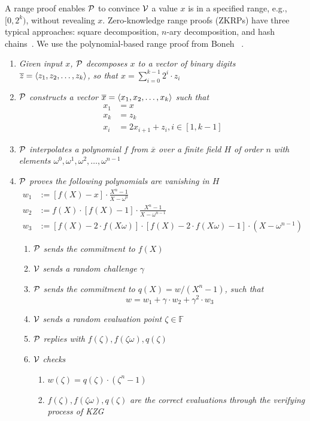 A range proof enables $\mathcal{P}$ to convince $\mathcal{V}$ a value $x$ is in a specified range, e.g., $[0,2^k)$, without revealing $x$. Zero-knowledge range proofs (ZKRPs) have three typical approaches: square decomposition, $n$-ary decomposition, and hash chains~\cite{zkrp}. We use the polynomial-based range proof from Boneh \etal~\cite{rangeproof}.
\begin{enumerate}
    \item \textit{Given input $x$, $\mathcal{P}$ decomposes $x$ to a vector of binary digits $\overline{z}=\left \langle z_1,z_2,\dots,z_k \right \rangle$, so that $x=\sum_{i=0}^{k-1}2^i\cdot{z_i}$} 
    \item \textit{$\mathcal{P}$ constructs a vector $\overline{x}=\left \langle x_1,x_2,\dots,x_k \right \rangle$ such that}
    \begin{align*}
        x_1&=x \\
        x_k&=z_k \\
        x_i&=2x_{i+1}+z_i,i\in[1,k-1]
    \end{align*}
    \item \textit{$\mathcal{P}$ interpolates a polynomial $f$ from $\overline{x}$ over a finite field $H$ of order $n$ with elements $\omega^0,\omega^1,\omega^2,\ldots,\omega^{n-1}$} 
    \item \textit{$\mathcal{P}$ proves the following polynomials are vanishing in $H$}
    \begin{align*}
        w_1&:=[f(X)-x]\cdot\frac{X^n-1}{X-\omega^0} \\
        w_2&:=f(X)\cdot[f(X)-1]\cdot\frac{X^n-1}{X-\omega^{n-1}} \\
        w_3&:=[f(X)-2\cdot{f(X\omega)}]\cdot[f(X)-2\cdot{f(X\omega)}-1]\cdot(X-\omega^{n-1})
    \end{align*}
    \begin{enumerate}
        \item $\mathcal{P}$ \textit{sends the commitment to $f(X)$}
        \item $\mathcal{V}$ \textit{sends a random challenge $\gamma$}
        \item $\mathcal{P}$ \textit{sends the commitment to $q(X)=w/(X^n-1)$, such that}
        \[ w=w_1+\gamma\cdot{w_2}+\gamma^2\cdot{w_3} \]
        \item $\mathcal{V}$ \textit{sends a random evaluation point $\zeta\in\mathbb{F}$}
        \item $\mathcal{P}$ \textit{replies with $f(\zeta),f(\zeta\omega),q(\zeta)$}
        \item $\mathcal{V}$ \textit{checks}
        \begin{enumerate}
            \item $w(\zeta)=q(\zeta)\cdot(\zeta^n-1)$
            \item $f(\zeta),f(\zeta\omega),q(\zeta)$ \textit{are the correct evaluations through the verifying process of KZG}
        \end{enumerate}
    \end{enumerate}
\end{enumerate}

